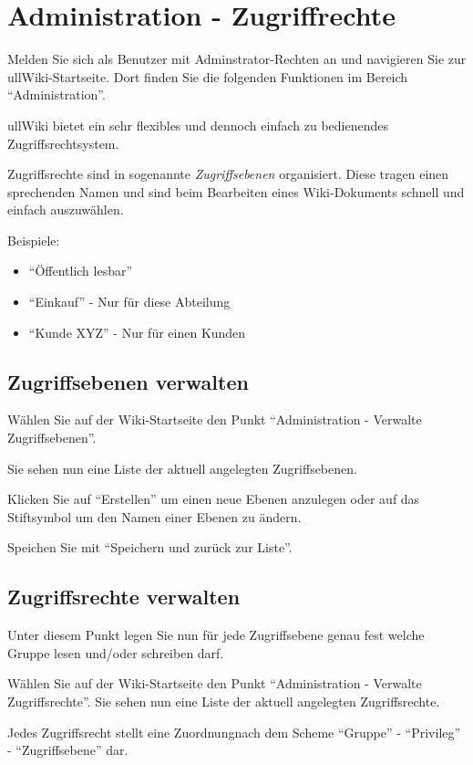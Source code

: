 \documentclass[article, a4paper, oneside, 11pt]{memoir}
\begin{document}
\chapter{Administration - Zugriffrechte}
\label{sec:admin}

Melden Sie sich als Benutzer mit Adminstrator-Rechten an und navigieren Sie zur ullWiki-Startseite. Dort finden Sie die folgenden Funktionen im Bereich "`Administration"'.

ullWiki bietet ein sehr flexibles und dennoch einfach zu bedienendes Zugriffsrechtsystem.

Zugriffsrechte sind in sogenannte \emph{Zugriffsebenen} organisiert. Diese tragen einen sprechenden Namen und sind beim Bearbeiten eines Wiki-Dokuments schnell und einfach auszuwählen.

Beispiele: 

\begin{itemize}
\item "`Öffentlich lesbar"'
\item "`Einkauf"' - Nur für diese Abteilung
\item "`Kunde XYZ"' - Nur für einen Kunden 
\end{itemize}


\section{Zugriffsebenen verwalten}
Wählen Sie auf der Wiki-Startseite den Punkt "`Administration - Verwalte Zugriffsebenen"'.

Sie sehen nun eine Liste der aktuell angelegten Zugriffsebenen.

Klicken Sie auf "`Erstellen"' um einen neue Ebenen anzulegen oder auf das Stiftsymbol um den Namen einer Ebenen zu ändern.

Speichen Sie mit "`Speichern und zurück zur Liste"'.



\section{Zugriffsrechte verwalten}
Unter diesem Punkt legen Sie nun für jede Zugriffsebene genau fest welche Gruppe lesen und/oder schreiben darf.

Wählen Sie auf der Wiki-Startseite den Punkt "`Administration - Verwalte Zugriffsrechte"'.
Sie sehen nun eine Liste der aktuell angelegten Zugriffsrechte.

Jedes Zugriffsrecht stellt eine Zuordnungnach dem Scheme "`Gruppe"' - "`Privileg"' - "`Zugriffsebene"' dar.
\end{document}

